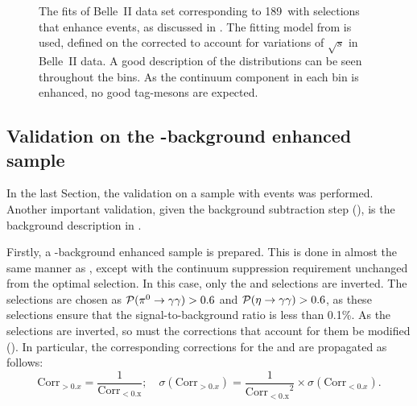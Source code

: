 \begin{figure}[hbtp!]
{    }
    \caption{\label{fig:mbc_qqbar_ehnhanced_fits}The fits of Belle~II data set corresponding to 189~\invfb with selections that enhance \epem\ra\qqbar events, as discussed in .
    The fitting model from  is used, defined on the corrected \Mbc to account for variations of $\sqrt{s}$ in Belle~II data.
    A good description of the \Mbc distributions can be seen throughout the \EB bins.
    As the continuum component in each \EB bin is enhanced, no good tag-\B mesons are expected.
    }
\end{figure}

\subsection{Validation on the \texorpdfstring{\BB}{BB}-background enhanced sample}\label{sec:bb_background_validation}

In the last Section, the validation on a sample with \epem\ra\qqbar events was performed.
Another important validation, given the background subtraction step (),
is the \BB background description in \MC.

Firstly, a \BB-background enhanced sample is prepared.
This is done in almost the same manner as , except with the continuum suppression requirement unchanged from the optimal selection.
In this case, only the \piVeto and \etaVeto selections are inverted.
The selections are chosen as ${\mathcal{P}(\pi^0\rightarrow\gamma\gamma)}>0.6$ and ${\mathcal{P}(\eta\rightarrow\gamma\gamma)}>0.6$, as these selections ensure that the signal-to-background ratio is less than 0.1\%.
As the selections are inverted, so must the corrections that account for them be modified ().
In particular, the corresponding corrections for the \piVeto and \etaVeto are propagated as follows:
\begin{equation}\label{eq:correction_transform}
    \mathrm{Corr}_{>0.x} = \frac{1}{\mathrm{Corr_{<0.x}}}; \quad \sigma(\mathrm{Corr}_{>0.x}) =  \frac{1}{\mathrm{Corr_{<0.x}}^2} \times \sigma(\mathrm{Corr}_{<0.x}).
\end{equation}

